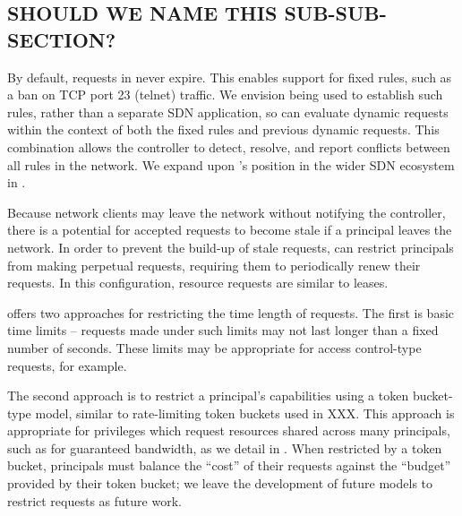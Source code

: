\subsection{SHOULD WE {\color{red} NAME} THIS SUB-SUB-SECTION?}

By default, requests in \sys never expire. This enables support for
fixed rules, such as a ban on TCP port 23 (telnet) traffic.
We envision \sys being used to establish
such rules, rather than a separate SDN application, so \sys can evaluate
dynamic requests within the context of both the fixed rules and
previous dynamic requests. This combination allows the \sys controller to detect,
resolve, and report conflicts between all rules in the network.
We expand upon \sys's position in the wider SDN ecosystem in .

Because network clients may leave the network without notifying the controller,
there is a potential for accepted requests to become stale if a principal
leaves the network. In order to prevent the build-up of stale requests, \sys
can restrict principals from making perpetual requests, requiring them to
periodically renew their requests. In this configuration, resource requests
are similar to leases.

\sys offers two approaches for restricting the time length of requests.
The first is basic time limits -- requests made under such limits may not
last longer than a fixed number of seconds. These limits
may be appropriate for access control-type requests, for example.

The second approach is to restrict a principal's capabilities using a
token bucket-type model, similar to rate-limiting token buckets used in {\color{red} XXX}.
This approach is appropriate for privileges which request resources
shared across many principals, such as for guaranteed bandwidth, as
we detail in . When restricted by a token bucket,
principals must balance the ``cost'' of their requests against the ``budget''
provided by their token bucket; we leave the development of future
models to restrict requests as future work.
